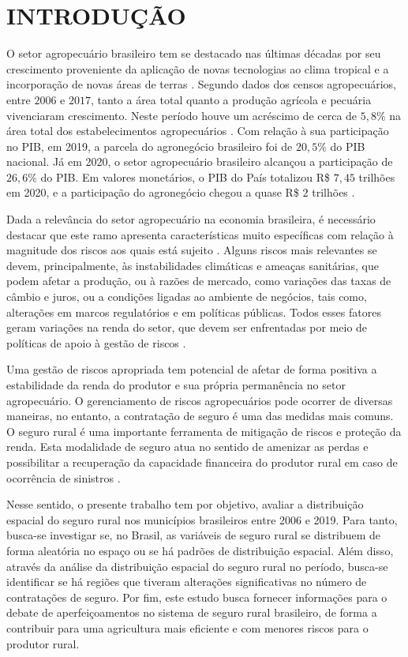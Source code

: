 \section{INTRODUÇÃO}

O setor agropecuário brasileiro tem se destacado nas últimas décadas por seu crescimento proveniente da aplicação de novas tecnologias ao clima tropical e a incorporação de novas áreas de terras \cite{brasil19}. Segundo dados dos censos agropecuários, entre $2006$ e $2017$, tanto a área total quanto a produção agrícola e pecuária vivenciaram crescimento. Neste período houve um acréscimo de cerca de $5,8\%$ na área total dos estabelecimentos agropecuários \cite{ibge19}. Com relação à sua participação no PIB, em 2019, a parcela do agronegócio brasileiro foi de  $20,5\%$  do PIB nacional. Já em 2020, o setor agropecuário brasileiro alcançou a participação de $26,6\%$ do PIB. Em valores monetários, o PIB do País totalizou R\$ $7,45$ trilhões em 2020, e a participação do agronegócio chegou a quase R\$ $2$ trilhões \cite{cepea21}. 

Dada a relevância do setor agropecuário na economia brasileira, é necessário destacar que este ramo apresenta características muito específicas com relação à magnitude dos riscos aos quais está sujeito \cite{burgo05}. Alguns riscos mais relevantes se devem, principalmente, às instabilidades climáticas e ameaças sanitárias, que podem afetar a produção, ou à razões de mercado, como variações das taxas de câmbio e juros, ou a condições ligadas ao ambiente de negócios, tais como, alterações em marcos regulatórios e em políticas públicas. Todos esses fatores geram variações na renda do setor, que devem ser enfrentadas por meio de políticas de apoio à gestão de riscos \cite{brasil21}. 

Uma gestão de riscos apropriada tem potencial de afetar de forma positiva a estabilidade da renda do produtor e sua própria permanência no setor agropecuário. O gerenciamento de riscos agropecuários pode ocorrer de diversas maneiras, no entanto, a contratação de seguro é uma das medidas mais comuns. O seguro rural é uma importante ferramenta de mitigação de riscos e proteção da renda. Esta modalidade de seguro atua no sentido de amenizar as perdas e possibilitar a recuperação da capacidade financeira do produtor rural em caso de ocorrência de sinistros \cite{brasil19b}. 

Nesse sentido, o presente trabalho tem por objetivo, avaliar a distribuição espacial do seguro rural nos municípios brasileiros entre 2006 e 2019. Para tanto, busca-se investigar se, no Brasil, as variáveis de seguro rural se distribuem de forma aleatória no espaço ou se há padrões de distribuição espacial. Além disso, através da análise da distribuição espacial do seguro rural no período, busca-se identificar se há regiões que tiveram alterações significativas no número de contratações de seguro. Por fim, este estudo busca fornecer informações para o debate de aperfeiçoamentos no sistema de seguro rural brasileiro, de forma a contribuir para uma agricultura mais eficiente e com menores riscos para o produtor rural.

